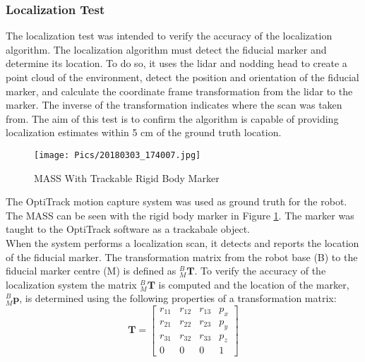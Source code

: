 \subsubsection{Localization Test}

The localization test was intended to verify the accuracy of the localization algorithm. The localization algorithm must detect the fiducial marker and determine its location. To do so, it uses the \acrshort{lidar} and nodding head to create a point cloud of the environment, detect the position and orientation of the fiducial marker, and calculate the coordinate frame transformation from the \acrshort{lidar} to the marker. The inverse of the transformation indicates where the scan was taken from. The aim of this test is to confirm the algorithm is capable of providing localization estimates within 5 cm of the ground truth location.\\

\begin{figure}
    \centering
    \texttt{[image: Pics/20180303\_174007.jpg]}
    \caption{MASS With Trackable Rigid Body Marker}
    \label{fig:rigidbody}
\end{figure}

The OptiTrack motion capture system was used as ground truth for the robot. The MASS can be seen with the rigid body marker in Figure \ref{fig:rigidbody}. The marker was taught to the OptiTrack software as a trackabale object.\\

When the system performs a localization scan, it detects and reports the location of the fiducial marker. The transformation matrix from the robot base (B) to the fiducial marker centre (M) is defined as $^B_M\mathbf{T}$. To verify the accuracy of the localization system the matrix $^B_{M}\mathbf{T}$ is computed and the location of the marker, $^B_{M}\mathbf{p}$, is determined using the following properties of a transformation matrix:\\

\begin{equation*}
\mathbf{T} = \begin{bmatrix}
    r_{11} & r_{12} & r_{13} & p_{x} \\
    r_{21} & r_{22} & r_{23} & p_{y} \\
    r_{31} & r_{32} & r_{33} & p_{z} \\
    0 & 0 & 0 & 1
\end{bmatrix}
\end{equation*}

